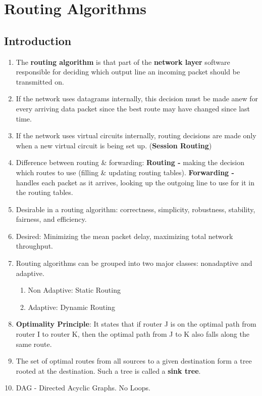 \documentclass[a4paper,oneside]{book}
\begin{document}
\chapter{Routing Algorithms}
\section{Introduction}
\begin{enumerate}
\item The \textbf{routing algorithm} is that part of the \textbf{network layer} software responsible for deciding which output line an incoming packet should be transmitted on. 
\item If the network uses datagrams internally, this decision must be made anew for every arriving data packet since the best route may have changed since last time. 
\item If the network uses virtual circuits internally, routing decisions are made only when a new virtual circuit is being set up. (\textbf{Session Routing})
\item Difference between routing \& forwarding: \textbf{Routing - } making the decision which routes to use (filling \& updating routing tables). \textbf{Forwarding -}  handles each packet as it arrives, looking up the outgoing line to use for it in the routing tables.
\item Desirable in a routing algorithm: correctness, simplicity, robustness, stability, fairness, and efficiency.
\item Desired: Minimizing the mean packet delay, maximizing total network throughput.
\item Routing algorithms can be grouped into two major classes: nonadaptive and adaptive. 
\begin{enumerate}
\item Non Adaptive: Static Routing
\item Adaptive: Dynamic Routing
\end{enumerate}
\item \textbf{Optimality Principle}: It states that if router J is on the optimal path from router I to router K, then the optimal path from J to K also falls along the same route. 
\item The set of optimal routes from all sources to a given destination form a tree rooted at the destination. Such a tree is called a \textbf{sink tree}.
\item DAG - Directed Acyclic Graphs. No Loops.
\end{enumerate}
\end{document}
